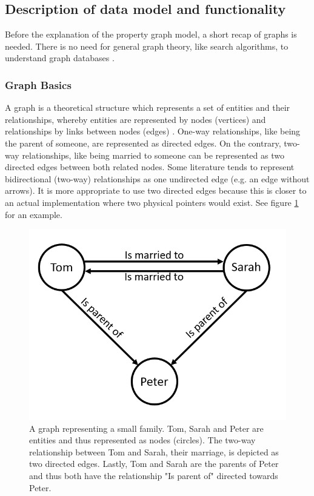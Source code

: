 \subsection{Description of data model and functionality}
Before the explanation of the property graph model, a short recap of graphs is needed. There is no need for general graph theory, like search algorithms, to understand graph databases \autocite{graphdb2015}.

\subsubsection{Graph Basics}
A graph is a theoretical structure which represents a set of entities and their relationships, whereby entities are represented by nodes (vertices) and relationships by links between nodes (edges) \autocite{maheshlal2015, graphdb2015}. One-way relationships, like being the parent of someone, are represented as directed edges. On the contrary, two-way relationships, like being married to someone can be represented as two directed edges between both related nodes. Some literature tends to represent bidirectional (two-way) relationships as one undirected edge (e.g. an edge without arrows). It is more appropriate to use two directed edges because this is closer to an actual implementation where two physical pointers would exist. See figure \ref{fig:graphdb:graph_example} for an example.

\begin{figure}[ht]
    \centering
    \includegraphics[width=.5\textwidth]{img/graph_example.PNG}
    \caption{A graph representing a small family. Tom, Sarah and Peter are entities and thus represented as nodes (circles). The two-way relationship between Tom and Sarah, their marriage, is depicted as two directed edges. Lastly, Tom and Sarah are the parents of Peter and thus both have the relationship "Is parent of" directed towards Peter.}
    \label{fig:graphdb:graph_example}
\end{figure}



